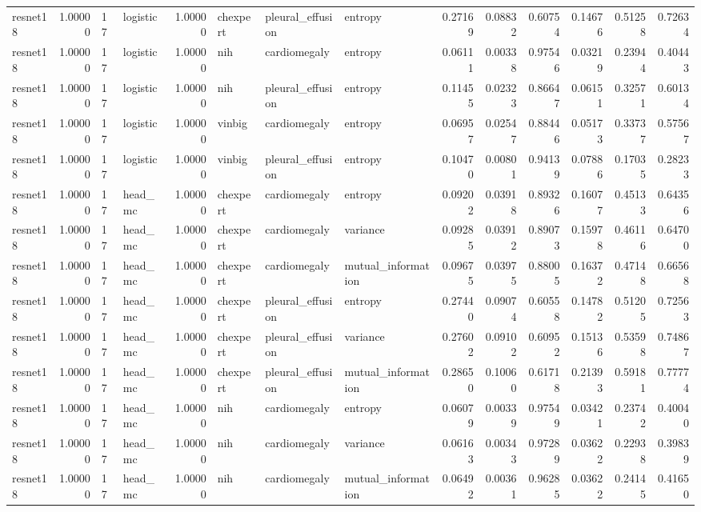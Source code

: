 \begin{tabular}{lrllrlllrrrrrr}
resnet18 & 1.00000 & 17 & logistic & 1.00000 & chexpert & pleural\_effusion & entropy & 0.27169 & 0.08832 & 0.60754 & 0.14676 & 0.51258 & 0.72634 \\
resnet18 & 1.00000 & 17 & logistic & 1.00000 & nih & cardiomegaly & entropy & 0.06111 & 0.00338 & 0.97546 & 0.03219 & 0.23944 & 0.40443 \\
resnet18 & 1.00000 & 17 & logistic & 1.00000 & nih & pleural\_effusion & entropy & 0.11455 & 0.02323 & 0.86647 & 0.06151 & 0.32571 & 0.60134 \\
resnet18 & 1.00000 & 17 & logistic & 1.00000 & vinbig & cardiomegaly & entropy & 0.06957 & 0.02547 & 0.88446 & 0.05173 & 0.33737 & 0.57567 \\
resnet18 & 1.00000 & 17 & logistic & 1.00000 & vinbig & pleural\_effusion & entropy & 0.10470 & 0.00801 & 0.94139 & 0.07886 & 0.17035 & 0.28233 \\
resnet18 & 1.00000 & 17 & head\_mc & 1.00000 & chexpert & cardiomegaly & entropy & 0.09202 & 0.03918 & 0.89326 & 0.16077 & 0.45133 & 0.64356 \\
resnet18 & 1.00000 & 17 & head\_mc & 1.00000 & chexpert & cardiomegaly & variance & 0.09285 & 0.03912 & 0.89073 & 0.15978 & 0.46116 & 0.64700 \\
resnet18 & 1.00000 & 17 & head\_mc & 1.00000 & chexpert & cardiomegaly & mutual\_information & 0.09675 & 0.03975 & 0.88005 & 0.16372 & 0.47148 & 0.66568 \\
resnet18 & 1.00000 & 17 & head\_mc & 1.00000 & chexpert & pleural\_effusion & entropy & 0.27440 & 0.09074 & 0.60558 & 0.14782 & 0.51205 & 0.72563 \\
resnet18 & 1.00000 & 17 & head\_mc & 1.00000 & chexpert & pleural\_effusion & variance & 0.27602 & 0.09102 & 0.60952 & 0.15136 & 0.53598 & 0.74867 \\
resnet18 & 1.00000 & 17 & head\_mc & 1.00000 & chexpert & pleural\_effusion & mutual\_information & 0.28650 & 0.10060 & 0.61718 & 0.21393 & 0.59181 & 0.77774 \\
resnet18 & 1.00000 & 17 & head\_mc & 1.00000 & nih & cardiomegaly & entropy & 0.06079 & 0.00339 & 0.97549 & 0.03421 & 0.23742 & 0.40040 \\
resnet18 & 1.00000 & 17 & head\_mc & 1.00000 & nih & cardiomegaly & variance & 0.06163 & 0.00343 & 0.97289 & 0.03622 & 0.22938 & 0.39839 \\
resnet18 & 1.00000 & 17 & head\_mc & 1.00000 & nih & cardiomegaly & mutual\_information & 0.06492 & 0.00361 & 0.96285 & 0.03622 & 0.24145 & 0.41650 \\

\end{tabular}
